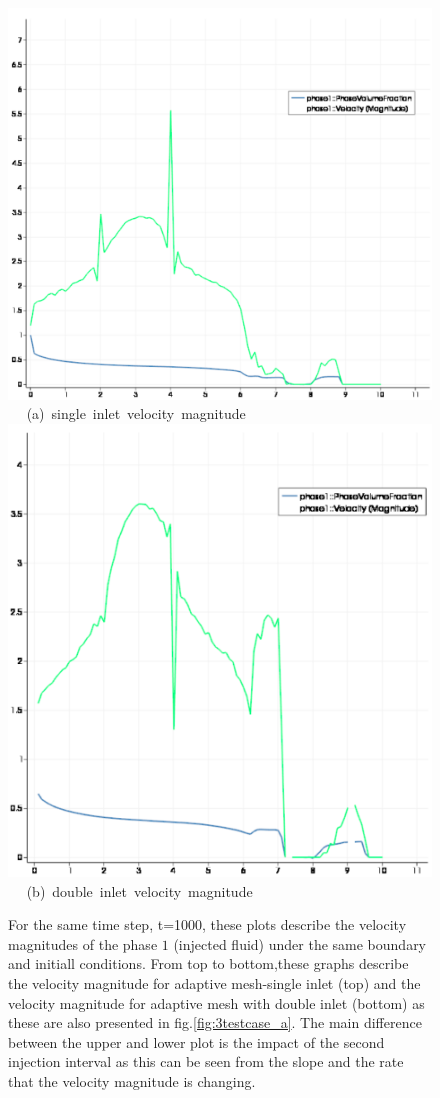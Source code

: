 \begin{figure}[ht] 
\vbox{
\hbox{\hspace{3.5cm}
\includegraphics[width=.5\textwidth]{./Pics1/mr10_5regions_adapt/5regions_adapt_vel_magn.pdf} 
}
\vspace{0.0cm}
\hbox{\hspace{5.0cm} (a) single inlet velocity magnitude   
}
\hbox{\hspace{3.5cm}
\includegraphics[width=.5\textwidth]{./Pics1/mr10_5regions_adapt_dinlet/5regions_dinlet_adapt_vel_magn.pdf}
}
\vspace{0.0cm}
\hbox{\hspace{5.0cm} (b) double inlet velocity magnitude   
}
}     
\caption{For the same time step, t=1000, these plots describe the velocity magnitudes of the phase $1$ (injected fluid) under the same boundary and initiall conditions. From top to bottom,these graphs describe the velocity magnitude %
for adaptive mesh-single inlet (top) and the velocity magnitude for adaptive mesh with double inlet (bottom) as these are also presented in fig.\ref{fig:3testcase_a}. The main difference between the upper and lower plot %
is the impact of the second injection interval as this can be seen from the slope and the rate that the velocity magnitude is changing.}
\label{fig:vel_magn}
\end{figure}

